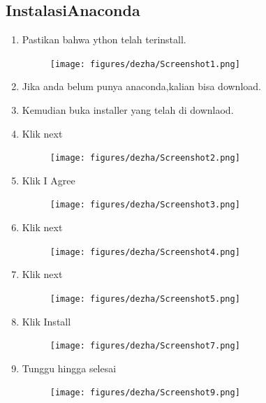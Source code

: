 \subsection{InstalasiAnaconda}
\begin{enumerate}
	\item Pastikan bahwa ython telah terinstall.
	\begin{figure}[H]
		\centering
		\texttt{[image: figures/dezha/Screenshot1.png]}
		\label{awal}
		\end{figure}
	\item Jika anda belum punya anaconda,kalian bisa download.
	\item Kemudian buka installer yang telah di downlaod.
	\item Klik next
	\begin{figure}[H]
		\centering
		\texttt{[image: figures/dezha/Screenshot2.png]}
		\label{Awal}
		\end{figure}

	\item Klik I Agree
	\begin{figure}[H]
		\centering
		\texttt{[image: figures/dezha/Screenshot3.png]}
		\label{Klik I Agree}
		\end{figure}

	\item Klik next
	\begin{figure}[H]
		\centering
		\texttt{[image: figures/dezha/Screenshot4.png]}
		\label{Pilih Just me, dan next}
		\end{figure}

	\item Klik next
	\begin{figure}[H]
		\centering
		\texttt{[image: figures/dezha/Screenshot5.png]}
		\label{Memilih letak dictionary}
		\end{figure}

	\item Klik Install
	\begin{figure}[H]
		\centering
		\texttt{[image: figures/dezha/Screenshot7.png]}
		\label{Pilih Register Anaconda as my default Python 3.2}
		\end{figure}

	\item Tunggu hingga selesai
	\begin{figure}[H]
		\centering
		\texttt{[image: figures/dezha/Screenshot9.png]}
		\label{Finish}
		\end{figure}

\end{enumerate}
